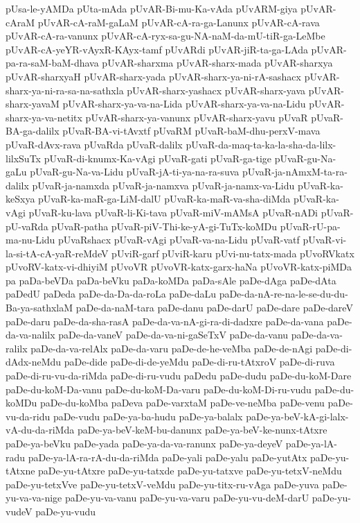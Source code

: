 {pUsa-le-yAMDa
pUta-mAda
pUvAR-Bi-mu-Ka-vAda
pUvARM-giya
pUvAR-cAraM
pUvAR-cA-raM-gaLaM
pUvAR-cA-ra-ga-Lanunx
pUvAR-cA-rava
pUvAR-cA-ra-vanunx
pUvAR-cA-ryx-sa-gu-NA-naM-da-mU-tiR-ga-LeMbe
pUvAR-cA-yeYR-vAyxR-KAyx-tamf
pUvARdi
pUvAR-jiR-ta-ga-LAda
pUvAR-pa-ra-saM-baM-dhava
pUvAR-sharxma
pUvAR-sharx-mada
pUvAR-sharxya
pUvAR-sharxyaH
pUvAR-sharx-yada
pUvAR-sharx-ya-ni-rA-sashacx
pUvAR-sharx-ya-ni-ra-sa-na-sathxla
pUvAR-sharx-yashacx
pUvAR-sharx-yava
pUvAR-sharx-yavaM
pUvAR-sharx-ya-va-na-Lida
pUvAR-sharx-ya-va-na-Lidu
pUvAR-sharx-ya-va-netitx
pUvAR-sharx-ya-vanunx
pUvAR-sharx-yavu
pUvaR
pUvaR-BA-ga-dalilx
pUvaR-BA-vi-tAvxtf
pUvaRM
pUvaR-baM-dhu-perxV-mava
pUvaR-dAvx-rava
pUvaRda
pUvaR-dalilx
pUvaR-da-maq-ta-ka-la-sha-da-lilx-lilxSuTx
pUvaR-di-knumx-Ka-vAgi
pUvaR-gati
pUvaR-ga-tige
pUvaR-gu-Na-gaLu
pUvaR-gu-Na-va-Lidu
pUvaR-jA-ti-ya-na-ra-suva
pUvaR-ja-nAmxM-ta-ra-dalilx
pUvaR-ja-namxda
pUvaR-ja-namxva
pUvaR-ja-namx-va-Lidu
pUvaR-ka-keSxya
pUvaR-ka-maR-ga-LiM-dalU
pUvaR-ka-maR-va-sha-diMda
pUvaR-ka-vAgi
pUvaR-ku-lava
pUvaR-li-Ki-tava
pUvaR-miV-mAMsA
pUvaR-nADi
pUvaR-pU-vaRda
pUvaR-patha
pUvaR-piV-Thi-ke-yA-gi-TuTx-koMDu
pUvaR-rU-pa-ma-nu-Lidu
pUvaRshacx
pUvaR-vAgi
pUvaR-va-na-Lidu
pUvaR-vatf
pUvaR-vi-la-si-tA-cA-yaR-reMdeV
pUviR-garf
pUviR-karu
pUvi-nu-tatx-mada
pUvoRVkatx
pUvoRV-katx-vi-dhiyiM
pUvoVR
pUvoVR-katx-garx-haNa
pUvoVR-katx-piMDa
pa
paDa-beVDa
paDa-beVku
paDa-koMDa
paDa-sAle
paDe-dAga
paDe-dAta
paDedU
paDeda
paDe-da-Da-da-roLa
paDe-daLu
paDe-da-nA-re-na-le-se-du-du-Ba-ya-sathxlaM
paDe-da-naM-tara
paDe-danu
paDe-darU
paDe-dare
paDe-dareV
paDe-daru
paDe-da-sha-rasA
paDe-da-va-nA-gi-ra-di-dadxre
paDe-da-vana
paDe-da-va-nalilx
paDe-da-vaneV
paDe-da-va-ni-gaSeTxV
paDe-da-vanu
paDe-da-va-ralilx
paDe-da-va-relAlx
paDe-da-varu
paDe-de-he-veMba
paDe-de-nAgi
paDe-di-dAdx-neMdu
paDe-dide
paDe-di-de-yeMdu
paDe-di-ru-tAtxroV
paDe-di-ruva
paDe-di-ru-vu-da-riMda
paDe-di-ru-vudu
paDedu
paDe-dudu
paDe-du-koM-Dare
paDe-du-koM-Da-vanu
paDe-du-koM-Da-varu
paDe-du-koM-Di-ru-vudu
paDe-du-koMDu
paDe-du-koMba
paDeva
paDe-varxtaM
paDe-ve-neMba
paDe-venu
paDe-vu-da-ridu
paDe-vudu
paDe-ya-ba-hudu
paDe-ya-balalx
paDe-ya-beV-kA-gi-lalx-vA-du-da-riMda
paDe-ya-beV-keM-bu-danunx
paDe-ya-beV-ke-nunx-tAtxre
paDe-ya-beVku
paDe-yada
paDe-ya-da-va-ranunx
paDe-ya-deyeV
paDe-ya-lA-radu
paDe-ya-lA-ra-rA-du-da-riMda
paDe-yali
paDe-yalu
paDe-yutAtx
paDe-yu-tAtxne
paDe-yu-tAtxre
paDe-yu-tatxde
paDe-yu-tatxve
paDe-yu-tetxV-neMdu
paDe-yu-tetxVve
paDe-yu-tetxV-veMdu
paDe-yu-titx-ru-vAga
paDe-yuva
paDe-yu-va-va-nige
paDe-yu-va-vanu
paDe-yu-va-varu
paDe-yu-vu-deM-darU
paDe-yu-vudeV
paDe-yu-vudu
}
